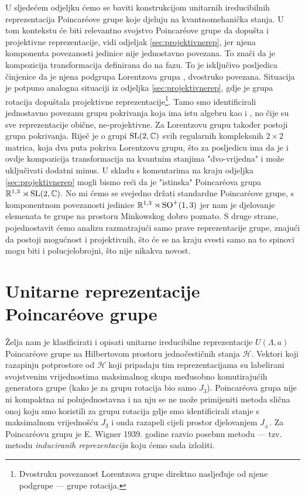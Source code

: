 U sljedećem odjeljku ćemo se baviti konstrukcijom unitarnih ireducibilnih
reprezentacija Poincar\'{e}ove grupe koje djeluju na kvantnomehanička stanja.
U tom kontekstu će biti relevantno svojstvo Poincar\'{e}ove grupe da
dopušta i projektivne reprezentacije, vidi odjeljak \ref{sec:projektivnerep},
jer njena komponenta povezanosti
jedinice nije jednostavno povezana. To znači da je kompozicija
transformacija definirana do na fazu.
To je isključivo posljedica 
činjenice da je njena podgrupa Lorentzova grupa ,
dvostruko povezana. Situacija je potpuno analogna situaciji iz
odjeljka \ref{sec:projektivnerep}, gdje je grupa rotacija
 dopuštala projektivne reprezentacije\footnote{Dvostruku
    povezanost Lorentzova grupe direktno nasljeđuje
od njene podgrupe --- grupe rotacija.}. Tamo smo identificirali
jednostavno povezanu grupu pokrivanja  koja ima istu algebru
kao i , no čije su sve reprezentacije obične, ne-projektivne.
Za Lorentzovu grupu također postoji grupa pokrivanja. Riječ je
o grupi $\mathrm{SL}(2, \mathbb{C})$ svih regularnih kompleksnih
$2\times 2$ matrica, koja dva puta pokriva Lorentzovu grupu,
što za posljedicu ima da je i ovdje kompozicija transformacija
na kvantnim stanjima "dvo-vrijedna" i može uključivati dodatni
minus. 
U skladu s komentarima na kraju odjeljka \ref{sec:projektivnerep} 
mogli bismo reći da je "istinska" Poincar\'{e}ova grupa
$\mathbb{R}^{1,3} \rtimes \mathrm{SL}(2, \mathbb{C})$. No mi ćemo
se svejedno držati standardne Poincar\'{e}ove grupe, s
komponentnom povezanosti jedinice $\mathbb{R}^{1,3} \rtimes \mathrm{SO}^{+}(1,3)$
jer nam je djelovanje elemenata te grupe na prostoru Minkowskog dobro poznato.
S druge strane, pojednostavit ćemo analizu razmatrajući
samo prave reprezentacije grupe, znajući da postoji mogućnost i
projektivnih, što će se na kraju svesti samo na to spinovi mogu
biti i polucjelobrojni, što nije nikakva novost.

\section{Unitarne reprezentacije Poincar\'{e}ove grupe}

Želja nam je klasificirati i opisati unitarne ireducibilne reprezentacije
$U(\Lambda, a)$
Poincar\'{e}ove grupe na Hilbertovom prostoru jednočestičnih stanja 
$\mathcal{H}$. Vektori koji razapinju potprostore od $\mathcal{H}$ koji
pripadaju tim reprezentacijama su labelirani svojstvenim vrijednostima
maksimalnog skupa međusobno komutirajućih generatora grupe
(kako je za grupu rotacija bio samo $J_3$). Poincar\'{e}ova grupa
nije ni kompaktna ni polujednostavna i na nju se ne može primijeniti
metoda slična onoj koju smo koristili za grupu rotacija  gdje smo
identificirali stanje s maksimalnom vrijednošću $J_3$ i onda razapeli
cijeli prostor djelovanjem $J_\pm$.
Za Poincar\'{e}ovu grupu je E. Wigner 1939. godine razvio posebnu
metodu --- tzv. metodu \emph{induciranih reprezentacija} koju ćemo
sada izložiti. 

